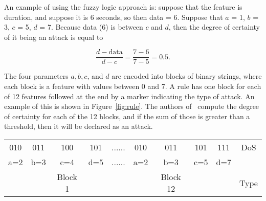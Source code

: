 \documentclass{sig-alternate}
\begin{document}
\begin{algorithm}[t]
\caption{Fuzzy Algorithm that is based on an algorithm used in~\cite{6496342, 6559603}, but a few corrections have been made. Also see Figure~\ref{fig:trapFigure}.}
\label{alg:fuzAlg}
\begin{algorithmic}
\ELSE {}
\ENDIF
\end{algorithmic}
\end{algorithm}

An example of using the fuzzy logic approach is: suppose that the feature is duration, and suppose it is 6 seconds, so then data = 6. Suppose that $a$ = 1, $b$ = 3, $c$ = 5, $d$ = 7. Because data (6) is between $c$ and $d$, then the degree of certainty of it being an attack is equal to

\begin{equation*}
\frac{d-\textrm{data}}{d-c} = \frac{7-6}{7-5} = 0.5.
\end{equation*}

The four parameters $a, b, c$, and $d$ are encoded into blocks of binary strings, where each block is a feature with values between 0 and 7. 
A rule has one block for each of 12 features followed at the end by a marker indicating the type of attack. An example of this is shown in Figure~\ref{fig:rule}. The authors of~\cite{6496342, 6559603} compute the degree of certainty for each of the 12 blocks, and if the sum of those is greater than a threshold, then it will be declared as an attack.


\begin{figure*}
\centering
\caption{A rule with 12 blocks of features used in~\cite{6496342, 6559603}.}
\vspace{0.20cm}
\begin{tabular}{|cccc|c|cccc|c|} \hline
010 & 011 & 100 & 101   & ...... & 010 & 011 & 101 & 111   & DoS\\
a=2 & b=3 & c=4 & d=5   & ...... & a=2 & b=3 & c=5 & d=7   &\\ 
    &     & Block 1&    &        &     & Block 12& &       & Type\\
\hline\end{tabular}
\label{fig:rule}
\end{figure*}
\end{document}
